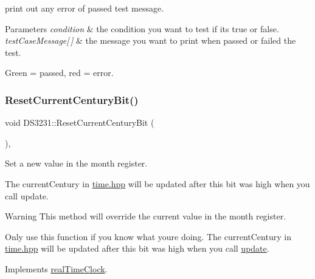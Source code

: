 print out any error of passed test message. 


\begin{DoxyParams}{Parameters}
{\em condition} & the condition you want to test if it\textquotesingle{}s true or false. \\
\hline
{\em test\+Case\+Message\mbox{[}$\,$\mbox{]}} & the message you want to print when passed or failed the test.\\
\hline
\end{DoxyParams}
Green = passed, red = error. \mbox{\label{class_d_s3231_a7559512806e2cc6f68a87ed3e15a53c8}} 
\subsubsection{\texorpdfstring{Reset\+Current\+Century\+Bit()}{ResetCurrentCenturyBit()}}
{\footnotesize\ttfamily void D\+S3231\+::\+Reset\+Current\+Century\+Bit (\begin{DoxyParamCaption}{ }\end{DoxyParamCaption})\hspace{0.3cm}{\ttfamily [override]}, {\ttfamily [virtual]}}



Set a new value in the month register. 

The current\+Century in \mbox{\hyperlink{time_8hpp_source}{time.\+hpp}} will be updated after this bit was high when you call update. \begin{DoxyWarning}{Warning}
This method will override the current value in the month register. 

Only use this function if you know what you\textquotesingle{}re doing. The current\+Century in \mbox{\hyperlink{time_8hpp_source}{time.\+hpp}} will be updated after this bit was high when you call \mbox{\hyperlink{class_d_s3231_a143ec57122d892ea0ec671a153352f2c}{update}}. 
\end{DoxyWarning}


Implements \mbox{\hyperlink{classreal_time_clock_a7e306358a315d54f4fa02ef0f792573b}{real\+Time\+Clock}}.

\mbox{\label{class_d_s3231_a0a9dc2668139654b261c2feeb1d6e663}} 
